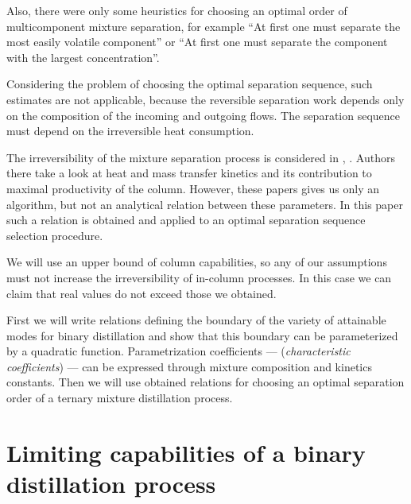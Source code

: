 \documentclass[12pt]{article}
\begin{document}
  Also, there were only some heuristics for choosing an optimal order of multicomponent mixture separation, for example ``At first one must separate the most easily volatile component'' or ``At first one must separate the component with the largest concentration''. 
  
  Considering the problem of choosing the optimal separation sequence, such estimates are not applicable, because the reversible separation work depends only on the composition of the incoming and outgoing flows. The separation sequence must depend on the irreversible heat consumption.     

     The irreversibility of the mixture separation process is considered in \cite{Berry}, \cite{TsGrig}. Authors there take a look at heat and mass transfer kinetics and its contribution to maximal productivity of the column. However, these papers gives us only an algorithm, but not an analytical relation between these parameters. In this paper such a relation is obtained and applied to an optimal separation sequence selection procedure.
     
     We will use an upper bound of column capabilities, so any of our assumptions must not increase the irreversibility of in-column processes. In this case we can claim that real values do not exceed those we obtained.
     
     First we will write relations defining the boundary of the variety of attainable modes for binary distillation and show that this boundary can be parameterized by a quadratic function. Parametrization coefficients --- (\textit{characteristic coefficients}) --- can be expressed through mixture composition and kinetics constants. Then we will use obtained relations for choosing an optimal separation order of a ternary mixture distillation process.

\section{Limiting capabilities of a binary distillation process}
\end{document}
